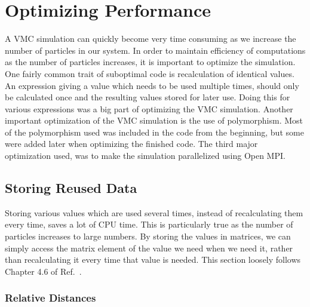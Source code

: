 \documentclass[../main.tex]{subfiles}
\begin{document}
\chapter{Optimizing Performance}\label{sec: OptimizingPerformance}

A VMC simulation can quickly become very time consuming as we increase the number of particles in our system. In order to maintain efficiency of computations as the number of particles increases, it is important to optimize the simulation. One fairly common trait of suboptimal code is recalculation of identical values. An expression giving a value which needs to be used multiple times, should only be calculated once and the resulting values stored for later use. Doing this for various expressions was a big part of optimizing the VMC simulation. Another important optimization of the VMC simulation is the use of polymorphism. Most of the polymorphism used was included in the code from the beginning, but some were added later when optimizing the finished code. The third major optimization used, was to make the simulation parallelized using Open MPI\cite{Open MPI}.

\section{Storing Reused Data}

Storing various values which are used several times, instead of recalculating them every time, saves a lot of CPU time. This is particularly true as the number of particles increases to large numbers. By storing the values in matrices, we can simply access the matrix element of the value we need when we need it, rather than recalculating it every time that value is needed. This section loosely follows Chapter 4.6 of Ref.~\cite{Jorgen}.

\subsection{Relative Distances}
\end{document}

